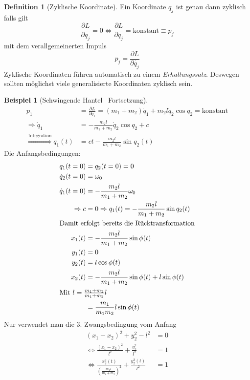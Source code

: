 \documentclass[oneside]{book}
\theoremstyle{definition}
\newtheorem*{definition*}{Definition}
\newtheorem*{beispiel*}{Beispiel}
\newcommand{\ffpartial}[2]{\frac{\partial #1}{\partial #2}}
\newcommand{\const}{\text{konstant}}
\begin{document}
\begin{definition*}[Zyklische Koordinate]\label{zyklische_koordinate}
	Ein Koordinate $q_j$ ist genau dann zyklisch falls gilt
	$$\ffpartial{L}{q_j} = 0 \Leftrightarrow \ffpartial{L}{\dot{q}_j} = \text{konstant} \equiv p_j$$
	mit dem verallgemeinerten Impuls 
	$$p_j = \ffpartial{L}{\dot{q_j}}$$
	Zyklische Koordinaten führen automatisch zu einem \textit{Erhaltungssatz}. Deswegen sollten möglichst viele generalisierte Koordinaten zyklisch sein.
\end{definition*}

\begin{beispiel*}[Schwingende Hantel \textendash~Fortsetzung]
	\begin{align*}
		p_1 &= \ffpartial{L}{\dot{q}_1} = (m_1 + m_2)\dot{q}_1 + m_2 l \dot{q}_2 \cos q_2 = \const\\
		\Rightarrow \dot{q}_1 &= - \frac{m_2 l}{m_1 + m_2} \dot{q}_2 \cos q_2 + c\\
		\overset{\text{Integration}}{\Rightarrow} q_1(t) &= ct - \frac{m_2 l}{m_1 + m_2} \sin q_2(t)
	\end{align*}
	Die Anfangsbedingungen:
	\begin{align*}
		q_1(t = 0) &= q_2(t = 0) = 0\\
		\dot{q}_2(t=0) &= \omega_0\\
		\dot{q}_1(t=0) &= - \frac{m_2 l}{m_1 + m_2} \omega_0\\
		\Rightarrow c &= 0 \Rightarrow q_1(t) = - \frac{m_2 l}{m_1 + m_2} \sin q_2(t)\\
		\intertext{Damit erfolgt bereits die Rücktransformation}
	x_1(t) &= - \frac{m_2 l}{m_1 + m_2} \sin \phi(t)\\
	y_1(t) &= 0\\
	y_2(t) &= l \cos \phi(t)\\
	x_2(t) &= - \frac{m_2 l}{m_1 + m_2} \sin \phi(t) + l \sin \phi(t)\\ 
	\intertext{Mit $l = \frac{m_1 + m_2}{m_1 + m_2} l$}
	&= \frac{m_1}{m_1 m_2} l \sin \phi(t)\\
	\end{align*}
	Nur verwendet man die 3. Zwangsbedingung vom Anfang
	\begin{align*}
	(x_1 - x_2)^2 + y_2^2 - l^2 &= 0\\
	\Leftrightarrow \frac{(x_1 - x_2)^2}{l^2} + \frac{y_2^2}{l^2} &= 1\\ 
	\Leftrightarrow \frac{x_2^2(t)}{(\frac{m_1 l}{m_1 + m_2})^2} + \frac{y_2^2(t)}{l^2} &= 1
	\end{align*}

\end{beispiel*}
\end{document}

